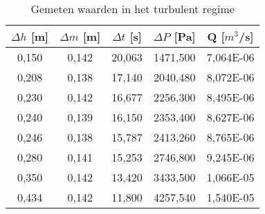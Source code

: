 \begin{table}[H]
    \centering
    \label{tab:TurFlow}
    \caption{Gemeten waarden in het turbulent regime}
    \begin{tabular}{| c | c | c | c | c |}
        \hline
        $\Delta h$ [m]  & $\Delta m$ [m]    & $\Delta t$ [s]    & $\Delta P$ [Pa]    & Q [$m^3$/s]      \\ \hline
        0,150           & 0,142             & 20,063            & 1471,500           & 7,064E-06        \\ \hline
        0,208           & 0,138             & 17,140            & 2040,480           & 8,072E-06         \\ \hline
        0,230           & 0,142             & 16,677            & 2256,300           & 8,495E-06         \\ \hline
        0,240           & 0,139             & 16,150            & 2353,400           & 8,627E-06         \\ \hline 
        0,246           & 0,138             & 15,787            & 2413,260           & 8,765E-06         \\ \hline
        0,280           & 0,141             & 15,253            & 2746,800           & 9,245E-06         \\ \hline
        0,350           & 0,142             & 13,420            & 3433,500           & 1,066E-05         \\ \hline
        0,434           & 0,142             & 11,800            & 4257,540           & 1,540E-05         \\ \hline
    \end{tabular}
\end{table}


